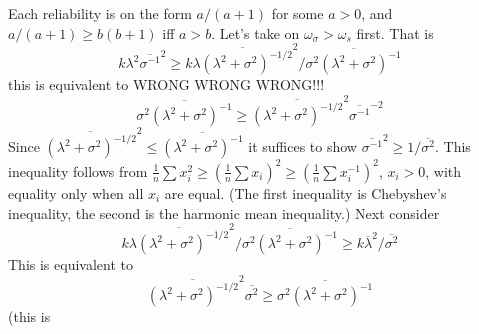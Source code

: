 \documentclass{article}
\makeatletter
\theoremstyle{plain}
\theoremstyle{plain}
\theoremstyle{definition}
\theoremstyle{remark}
\theoremstyle{definition}
\theoremstyle{plain}
\theoremstyle{plain}
\theoremstyle{definition}
\newenvironment{proof}[1][\protect\proofname]{\par
	\normalfont\topsep6\p@\@plus6\p@\relax
	\trivlist
	\itemindent\parindent
	\item[\hskip\labelsep\scshape #1]\ignorespaces
}{%
	\endtrivlist\@endpefalse
}
\providecommand{\proofname}{Proof}
\makeatother
\begin{document}
\begin{proof}[Proof of Proposition \ref{prop:Properties of three}]\label{proof:Properties}
Each reliability is on the form $a/(a+1)$ for some $a>0$, and $a/(a+1)\geq b(b+1)$
iff $a>b$. Let's take on $\omega_{\sigma}>\omega_{s}$ first. That
is
\[
k\lambda^{2}\overline{\sigma^{-1}}^{2}\geq k\overline{\lambda(\lambda^{2}+\sigma^{2})^{-1/2}}^{2}/\overline{\sigma^{2}(\lambda^{2}+\sigma^{2})^{-1}}
\]
this is equivalent to WRONG WRONG WRONG!!!
\[
\overline{\sigma^{2}(\lambda^{2}+\sigma^{2})^{-1}}\geq\overline{(\lambda^{2}+\sigma^{2})^{-1/2}}^{2}\overline{\sigma^{-1}}^{-2}
\]
Since $\overline{(\lambda^{2}+\sigma^{2})^{-1/2}}^{2}\leq\overline{(\lambda^{2}+\sigma^{2})^{-1}}$
it suffices to show $\overline{\sigma^{-1}}^{2}\geq1/\overline{\sigma^{2}}$.
This inequality follows from $\frac{1}{n}\sum x_{i}^{2}\geq\left(\frac{1}{n}\sum x_{i}\right)^{2}\geq\left(\frac{1}{n}\sum x_{i}^{-1}\right)^{2}$,
$x_{i}>0$, with equality only when all $x_{i}$ are equal. (The first
inequality is Chebyshev's inequality, the second is the harmonic mean
inequality.) Next consider
\[
k\overline{\lambda(\lambda^{2}+\sigma^{2})^{-1/2}}^{2}/\overline{\sigma^{2}(\lambda^{2}+\sigma^{2})^{-1}}\geq k\overline{\lambda}^{2}/\overline{\sigma^{2}}
\]
This is equivalent to 
\[
\overline{(\lambda^{2}+\sigma^{2})^{-1/2}}^{2}\overline{\sigma^{2}}\geq\overline{\sigma^{2}(\lambda^{2}+\sigma^{2})^{-1}}
\]
(this is
\end{proof}



\end{document}
